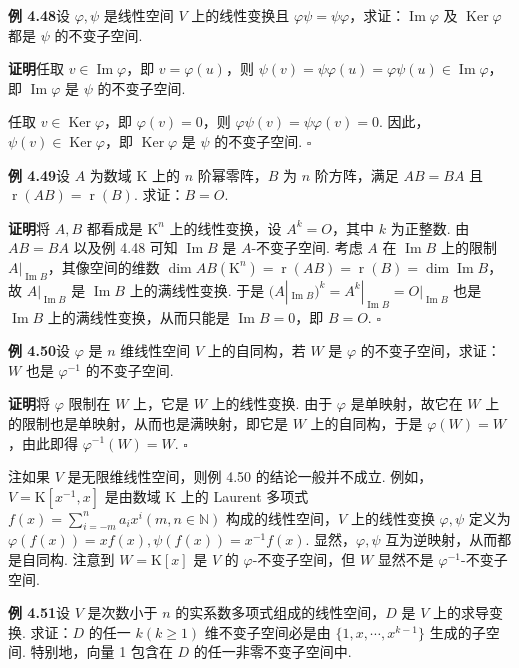 \documentclass[UTF8, 12pt, fontset=fandol, oneside]{ctexart}
\begin{document}
\noindent\textbf{例 4.48}\quad 设 $\varphi,\psi$ 是线性空间 $V$ 上的线性变换且 $\varphi\psi=\psi\varphi$，求证：$\operatorname{Im}\varphi$ 及 $\operatorname{Ker}\varphi$ 都是 $\psi$ 的不变子空间.

\noindent\textbf{证明}\quad 任取 $v\in\operatorname{Im}\varphi$，即 $v=\varphi(u)$，则 $\psi(v)=\psi\varphi(u)=\varphi\psi(u)\in\operatorname{Im}\varphi$，即 $\operatorname{Im}\varphi$ 是 $\psi$ 的不变子空间.

任取 $v\in\operatorname{Ker}\varphi$，即 $\varphi(v)=0$，则 $\varphi\psi(v)=\psi\varphi(v)=0$. 因此，$\psi(v)\in\operatorname{Ker}\varphi$，即 $\operatorname{Ker}\varphi$ 是 $\psi$ 的不变子空间. $\square$

\noindent\textbf{例 4.49}\quad 设 $A$ 为数域 $\mathrm{K}$ 上的 $n$ 阶幂零阵，$B$ 为 $n$ 阶方阵，满足 $AB=BA$ 且 $\operatorname{r}(AB)=\operatorname{r}(B)$. 求证：$B=O$.

\noindent\textbf{证明}\quad 将 $A,B$ 都看成是 $\mathrm{K}^n$ 上的线性变换，设 $A^k=O$，其中 $k$ 为正整数. 由 $AB=BA$ 以及例 4.48 可知 $\operatorname{Im}B$ 是 $A$-不变子空间. 考虑 $A$ 在 $\operatorname{Im}B$ 上的限制 $A|_{\operatorname{Im}B}$，其像空间的维数 $\dim AB(\mathrm{K}^n)=\operatorname{r}(AB)=\operatorname{r}(B)=\dim\operatorname{Im}B$，故 $A|_{\operatorname{Im}B}$ 是 $\operatorname{Im}B$ 上的满线性变换. 于是 $(A|_{\operatorname{Im}B})^k=A^k|_{\operatorname{Im}B}=O|_{\operatorname{Im}B}$ 也是 $\operatorname{Im}B$ 上的满线性变换，从而只能是 $\operatorname{Im}B=0$，即 $B=O$. $\square$

\noindent\textbf{例 4.50}\quad 设 $\varphi$ 是 $n$ 维线性空间 $V$ 上的自同构，若 $W$ 是 $\varphi$ 的不变子空间，求证：$W$ 也是 $\varphi^{-1}$ 的不变子空间.

\noindent\textbf{证明}\quad 将 $\varphi$ 限制在 $W$ 上，它是 $W$ 上的线性变换. 由于 $\varphi$ 是单映射，故它在 $W$ 上的限制也是单映射，从而也是满映射，即它是 $W$ 上的自同构，于是 $\varphi(W)=W$，由此即得 $\varphi^{-1}(W)=W$. $\square$

注\quad 如果 $V$ 是无限维线性空间，则例 4.50 的结论一般并不成立. 例如，$V=\mathrm{K}[x^{-1},x]$ 是由数域 $\mathrm{K}$ 上的 Laurent 多项式 $f(x)=\sum_{i=-m}^n a_ix^i(m,n\in\mathbb{N})$ 构成的线性空间，$V$ 上的线性变换 $\varphi,\psi$ 定义为 $\varphi(f(x))=xf(x),\psi(f(x))=x^{-1}f(x)$. 显然，$\varphi,\psi$ 互为逆映射，从而都是自同构. 注意到 $W=\mathrm{K}[x]$ 是 $V$ 的 $\varphi$-不变子空间，但 $W$ 显然不是 $\varphi^{-1}$-不变子空间.

\noindent\textbf{例 4.51}\quad 设 $V$ 是次数小于 $n$ 的实系数多项式组成的线性空间，$D$ 是 $V$ 上的求导变换. 求证：$D$ 的任一 $k(k\ge1)$ 维不变子空间必是由 $\{1,x,\cdots,x^{k-1}\}$ 生成的子空间. 特别地，向量 1 包含在 $D$ 的任一非零不变子空间中.
\end{document}
